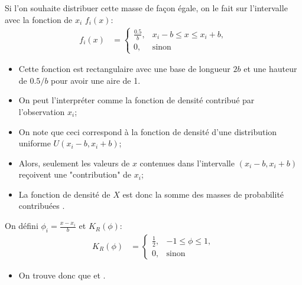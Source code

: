 \documentclass[10pt, french]{article}
\begin{document}
\begin{multicols*}{2}
Si l'on souhaite distribuer cette masse de façon égale, on le fait sur l'intervalle \icbox{$[x_{i}  - b, x_{i} + b]$} avec la fonction de $x_{i}$ $f_{i}(x)$:
\begin{align*}
	f_{i}(x)
	&=	\begin{cases}
		\frac{0.5}{b},	&	x_{i} - b	\leq		x	\leq		x_{i} + b,	\\
		0,	&	\text{sinon}
		\end{cases}	
\end{align*}
\begin{itemize}[leftmargin = *]
	\item	Cette fonction est rectangulaire avec une base de longueur $2b$ et une hauteur de $0.5/b$ pour avoir une aire de 1.
	\item	On peut l'interpréter comme la fonction de densité contribué par l'observation $x_{i}$;
	\item	On note que ceci correspond à la fonction de densité d'une distribution uniforme $U(x_{i} -  b, x_{i} + b)$;
	\item	Alors, seulement les valeurs de $x$ contenues dans l'intervalle $(x_{i} -  b, x_{i} + b)$ reçoivent une "contribution" de $x_{i}$;
	\item	La fonction de densité de $X$ est donc la somme des masses de probabilité contribuées .
\end{itemize}

On défini $\phi_{i}	=	\frac{x - x_{i}}{b}$ et $K_{R}(\phi)$:
\begin{align*}
	K_{R}(\phi)
	&=	\begin{cases}
		\frac{1}{2},	&	-1	\leq		\phi	\leq		1,	\\
		0,	&	\text{sinon}
		\end{cases}	
\end{align*}
\begin{itemize}[leftmargin = *]
	\item	On trouve donc que  et .
\end{itemize}


\end{multicols*}
\end{document}
